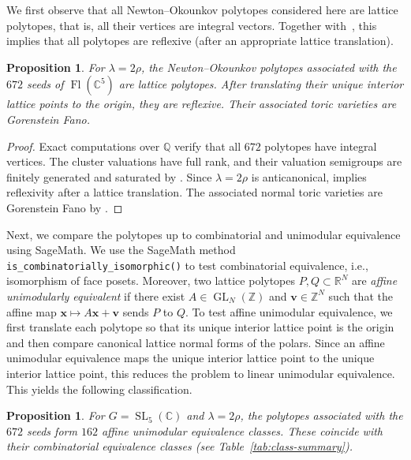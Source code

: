 \documentclass[10pt]{amsart}
\numberwithin{equation}{section}
\DeclareMathOperator{\SL}{SL}
\DeclareMathOperator{\GL}{GL}
\newcommand{\C}{{\mathbb{C}}}
\newcommand{\R}{{\mathbb{R}}}
\newcommand{\Z}{{\mathbb{Z}}}
\DeclareMathOperator{\flag}{Fl}
\theoremstyle{plain}
\newtheorem{proposition}[theorem]{Proposition}
\theoremstyle{definition}
\theoremstyle{remark}
\begin{document}
We first observe that all Newton--Okounkov polytopes
considered here are lattice polytopes, that is,
all their vertices are integral vectors. Together with~\cite[Corollary~5.1]{Steinert22}, this implies that all polytopes are reflexive (after an appropriate lattice translation).

\begin{proposition}\label{prop_lattice}
For $\lambda=2\rho$,  the Newton--Okounkov polytopes 
associated with
the $672$ seeds of $\flag(\mathbb C^5)$ are lattice polytopes.
After translating their unique interior lattice points to the origin,
they are reflexive. Their associated toric varieties are
Gorenstein Fano. 
\end{proposition}
\begin{proof}
Exact computations over $\mathbb Q$ verify that all $672$
polytopes have integral vertices. The cluster valuations have
full rank, and their valuation semigroups are finitely generated
and saturated by \cite[Corollary~6.9(2)]{FujitaOya}.
Since $\lambda=2\rho$ is anticanonical,
\cite[Corollary~5.1]{Steinert22} implies reflexivity after a
lattice translation. The associated normal toric varieties are
Gorenstein Fano by \cite[Proposition~2.2.23]{Batyrev94}.	
\end{proof}


Next, we compare the polytopes up to combinatorial and unimodular equivalence using SageMath.
We use the SageMath method \verb|is_combinatorially_isomorphic()| to test combinatorial equivalence, i.e., isomorphism of face posets.
Moreover, two lattice polytopes $P, Q \subset \R^N$ are \emph{affine unimodularly equivalent} if there exist $A \in \GL_N(\Z)$ and $\mathbf{v} \in \Z^N$ such that the affine map $\mathbf{x} \mapsto A \mathbf{x} + \mathbf{v}$ sends $P$ to $Q$.
To test affine unimodular equivalence, we first translate each
polytope so that its unique interior lattice point is the origin
and then compare canonical lattice normal forms of the polars.
Since an affine unimodular equivalence maps the unique interior
lattice point to the unique interior lattice point, this reduces
the problem to linear unimodular equivalence. This yields the
following classification.


\begin{proposition}\label{prop_unimodular}
For $G=\SL_5(\C)$ and $\lambda=2\rho$, the polytopes
associated with the $672$ seeds form $162$ affine
unimodular equivalence classes.
These coincide with their combinatorial equivalence
classes \textup{(}see Table~\ref{tab:class-summary}\textup{)}.	
\end{proposition}
\end{document}
